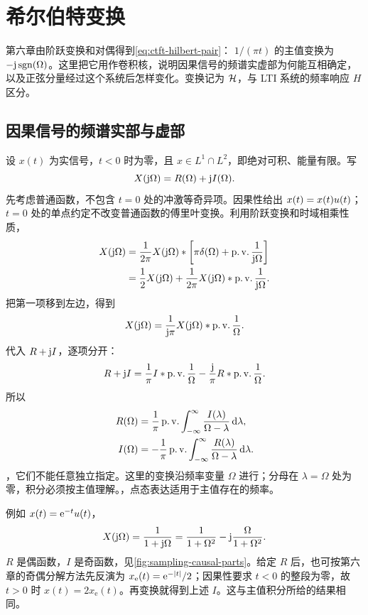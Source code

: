 \section{希尔伯特变换}
\label{sec:sampling-hilbert}

第六章由阶跃变换和对偶得到\cref{eq:ctft-hilbert-pair}：
$1/(\pi t)$ 的主值变换为 $-\mathrm{j}\operatorname{sgn}(\Omega)$。这里把它用作卷积核，说明因果信号的频谱实虚部为何能互相确定，以及正弦分量经过这个系统后怎样变化。变换记为 $\mathcal{H}$，与 LTI 系统的频率响应 $H$ 区分。

\subsection{因果信号的频谱实部与虚部}
\label{subsec:sampling-causal-hilbert}

设 $x(t)$ 为实信号，$t<0$ 时为零，且 $x\in L^1\cap L^2$，即绝对可积、能量有限。写
\[
  X(\mathrm{j}\Omega)=R(\Omega)+\mathrm{j} I(\Omega).
\]
先考虑普通函数，不包含 $t=0$ 处的冲激等奇异项。因果性给出 $x(t)=x(t)u(t)$；$t=0$ 处的单点约定不改变普通函数的傅里叶变换。利用阶跃变换和时域相乘性质，
\begin{align*}
  X(\mathrm{j}\Omega)
  &=\frac1{2\pi}X(\mathrm{j}\Omega)\mathbin{\ast}
       \left[\pi\delta(\Omega)+\operatorname{p.v.}\frac1{\mathrm{j}\Omega}\right]\\
  &=\frac12X(\mathrm{j}\Omega)
       +\frac1{2\pi}X(\mathrm{j}\Omega)\mathbin{\ast}\operatorname{p.v.}\frac1{\mathrm{j}\Omega}.
\end{align*}
把第一项移到左边，得到
\[
  X(\mathrm{j}\Omega)=\frac1{\mathrm{j}\pi}
      X(\mathrm{j}\Omega)\mathbin{\ast}\operatorname{p.v.}\frac1\Omega.
\]
代入 $R+\mathrm{j} I$，逐项分开：
\[
  R+\mathrm{j} I=\frac1\pi I\mathbin{\ast}\operatorname{p.v.}\frac1\Omega
             -\frac{\mathrm{j}}{\pi}R\mathbin{\ast}\operatorname{p.v.}\frac1\Omega.
\]
所以
\begin{equation}
  \begin{aligned}
    R(\Omega)&=\frac1\pi\operatorname{p.v.}\int_{-\infty}^{\infty}
                \frac{I(\lambda)}{\Omega-\lambda}\mathop{}\!\mathrm{d}\lambda,\\
    I(\Omega)&=-\frac1\pi\operatorname{p.v.}\int_{-\infty}^{\infty}
                \frac{R(\lambda)}{\Omega-\lambda}\mathop{}\!\mathrm{d}\lambda.
  \end{aligned}
  \label{eq:sampling-causal-real-imag}
\end{equation}
，它们不能任意独立指定。这里的变换沿频率变量 $\Omega$ 进行；分母在 $\lambda=\Omega$ 处为零，积分必须按主值理解。，点态表达适用于主值存在的频率。

例如 $x(t)=\mathrm{e}^{-t}u(t)$，
\[
  X(\mathrm{j}\Omega)=\frac1{1+\mathrm{j}\Omega}
    =\frac1{1+\Omega^2}-\mathrm{j}\frac{\Omega}{1+\Omega^2}.
\]
$R$ 是偶函数，$I$ 是奇函数，见\cref{fig:sampling-causal-parts}。给定 $R$ 后，也可按第六章的奇偶分解方法先反演为
$x_{\mathrm e}(t)=\mathrm{e}^{-|t|}/2$；因果性要求 $t<0$ 的整段为零，故 $t>0$ 时 $x(t)=2x_{\mathrm e}(t)$。再变换就得到上述 $I$。这与主值积分所给的结果相同。

